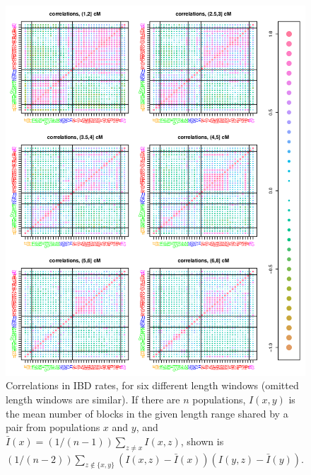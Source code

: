\documentclass{article}
\begin{document}
\begin{figure}[!htp]
  \begin{center}
    \vspace{2em}
    \begin{center}
      \includegraphics[width=\textwidth]{sharing-correlations.png}
    \end{center}
    \vspace{2em}
    \caption{
     Correlations in IBD rates, for six different length windows
     (omitted length windows are similar).
     If there are $n$ populations,
     $I(x,y)$ is the mean number of blocks in the given length range shared by a pair from populations $x$ and $y$,
     and $\bar I(x) = (1/(n-1))\sum_{z \neq x} I(x,z)$,
     shown is $(1/(n-2)) \sum_{z\notin\{x,y\}} (I(x,z)-\bar I(x))(I(y,z)-\bar I(y))$.
    \label{sfig:correlations}
    }
  \end{center}
\end{figure}
\end{document}
